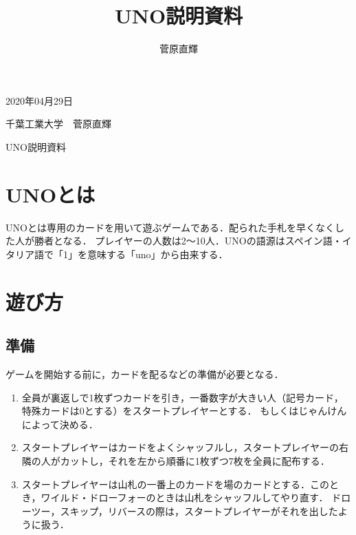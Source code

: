 \documentclass[11pt]{ltjsarticle}
\title{UNO説明資料}
\author{菅原直輝}
\begin{document}
\thispagestyle{empty}
\vspace*{20pt}

\begin{flushright}
  2020年04月29日

  千葉工業大学　菅原直輝
\end{flushright}

\vspace*{100pt}
\begin{center}
{\Huge UNO説明資料}
\end{center}

\newpage

\tableofcontents

\clearpage
{}

\section{UNOとは}
UNOとは専用のカードを用いて遊ぶゲームである．配られた手札を早くなくした人が勝者となる．
プレイヤーの人数は2～10人．UNOの語源はスペイン語・イタリア語で「1」を意味する「uno」から由来する\cite{UNO-AMAZON}．


\section{遊び方}
\subsection{準備}
ゲームを開始する前に，カードを配るなどの準備が必要となる\cite{日本ウノ協会公認ルール}．
\begin{enumerate}
  \label{ゲーム準備}
  \item 全員が裏返しで1枚ずつカードを引き，一番数字が大きい人（記号カード，特殊カードは0とする）をスタートプレイヤーとする．
  もしくはじゃんけんによって決める．
  \item スタートプレイヤーはカードをよくシャッフルし，スタートプレイヤーの右隣の人がカットし，それを左から順番に1枚ずつ7枚を全員に配布する．
  \item スタートプレイヤーは山札の一番上のカードを場のカードとする．このとき，ワイルド・ドローフォーのときは山札をシャッフルしてやり直す．
  ドローツー，スキップ，リバースの際は，スタートプレイヤーがそれを出したように扱う．
\end{enumerate}
\end{document}
